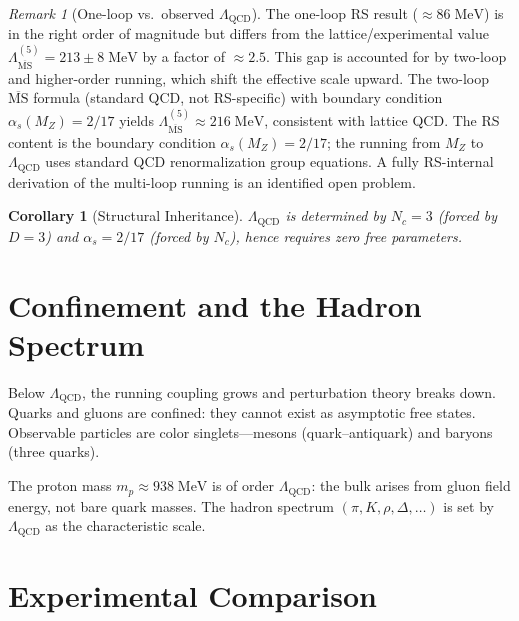 \documentclass[12pt,a4paper]{article}
\newtheorem{corollary}[theorem]{Corollary}
\theoremstyle{definition}
\theoremstyle{remark}
\newtheorem{remark}[theorem]{Remark}
\begin{document}
\begin{remark}[One-loop vs.\ observed $\Lambda_{\mathrm{QCD}}$]
\label{rem:lambda-status}
The one-loop RS result ($\approx 86\;\mathrm{MeV}$) is in the right
order of magnitude but differs from the lattice/experimental value
$\Lambda_{\overline{\mathrm{MS}}}^{(5)} = 213 \pm 8\;\mathrm{MeV}$
by a factor of $\approx 2.5$.  This gap is accounted for by
two-loop and higher-order running, which shift the effective scale
upward.  The two-loop $\overline{\mathrm{MS}}$ formula (standard
QCD, not RS-specific) with boundary condition $\alpha_s(M_Z) = 2/17$
yields $\Lambda_{\overline{\mathrm{MS}}}^{(5)} \approx 216\;\mathrm{MeV}$,
consistent with lattice QCD.  The RS content is the boundary
condition $\alpha_s(M_Z) = 2/17$; the running from $M_Z$ to
$\Lambda_{\mathrm{QCD}}$ uses standard QCD renormalization group
equations.  A fully RS-internal derivation of the multi-loop
running is an identified open problem.
\end{remark}

\begin{corollary}[Structural Inheritance]
\label{cor:zero}
$\Lambda_{\mathrm{QCD}}$ is determined by $N_c = 3$ (forced by
$D = 3$) and $\alpha_s = 2/17$ (forced by $N_c$), hence requires
zero free parameters.
\end{corollary}

\section{Confinement and the Hadron Spectrum}
\label{sec:confinement}

Below $\Lambda_{\mathrm{QCD}}$, the running coupling grows and
perturbation theory breaks down.  Quarks and gluons are confined:
they cannot exist as asymptotic free states.  Observable particles
are color singlets---mesons (quark--antiquark) and baryons
(three quarks).

The proton mass $m_p \approx 938\;\mathrm{MeV}$ is of order
$\Lambda_{\mathrm{QCD}}$: the bulk arises from gluon field energy,
not bare quark masses.  The hadron spectrum $(\pi, K, \rho,
\Delta, \ldots)$ is set by $\Lambda_{\mathrm{QCD}}$ as the
characteristic scale.

\section{Experimental Comparison}
\label{sec:comparison}
\end{document}
